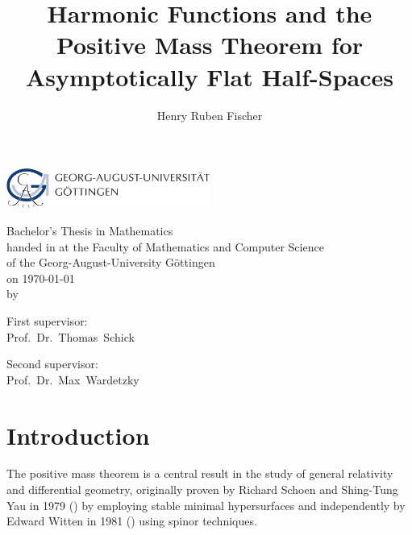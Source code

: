 \documentclass[titlepage,numbers=noenddot,oneside,%
cleardoublepage=empty,paper=a4,fontsize=11pt,%
english,%
]{scrartcl}
\title{Harmonic Functions and the Positive Mass Theorem for Asymptotically Flat Half-Spaces}
\author{Henry Ruben Fischer}
\begin{document}
\theoremstyle{plain}
\makeatletter
\begin{titlepage}
\begin{center}

\textsc{\LARGE \@title}

\vspace{2cm}

\includegraphics[width=0.5\textwidth]{Logo.pdf}

\vspace{1.5cm}

\Large Bachelor's Thesis in Mathematics \\
\Large handed in at the Faculty of Mathematics and Computer Science\\
\Large of the Georg-August-University Göttingen\\
on \today\\

\vspace{1cm}
\small{by}\\

\large{\@author}
\vspace{1cm}

\small{First supervisor:}\\

\large{Prof.~Dr.~Thomas~Schick}

\vspace{1cm}

\small{Second supervisor:}\\

\large{Prof.~Dr.~Max~Wardetzky}

\end{center}
\end{titlepage}
\makeatother

\tableofcontents
\newpage
{}
\section{Introduction}


The positive mass theorem is a central result in the study of general relativity and differential geometry, originally proven by Richard Schoen and Shing-Tung Yau in 1979 (\cite{schoenProofPositiveMass1979}) by employing stable minimal hypersurfaces and independently by Edward Witten in 1981 (\cite{wittenNewProofPositive1981}) using spinor techniques.
\end{document}
